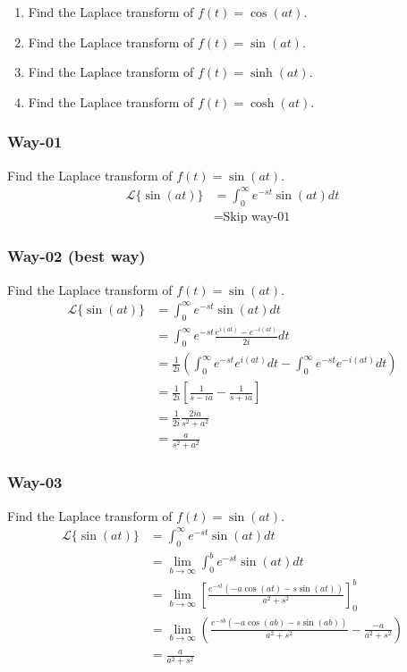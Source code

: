 \documentclass[11pt]{beamer}
\theoremstyle{plain}
\begin{document}
\begin{frame}
        \begin{example}
        \begin{enumerate}[label=\alph*.] 
            \item Find the Laplace transform of $f(t)=\cos(at)$.
            \item Find the Laplace transform of $f(t)=\sin(at)$.
            \item Find the Laplace transform of $f(t)=\sinh(at)$.
            \item Find the Laplace transform of $f(t)=\cosh(at)$.
        \end{enumerate}
    \end{example}
\end{frame}


\begin{frame}
    \frametitle{Way-01}
    Find the Laplace transform of $f(t)=\sin(at)$.
    \begin{align*}
        \mathcal L\{\sin(at)\} &=\int_0^\infty e^{-st}\sin(at)dt\\
        &= \text{Skip way-01} 
    \end{align*}
\end{frame}

\begin{frame}
    \frametitle{Way-02 (best way)}
    Find the Laplace transform of $f(t)=\sin(at)$.
    \begin{align*}
        \mathcal L\{\sin(at)\} &=\int_0^\infty e^{-st}\sin(at)dt \\
        &= \int_0^\infty e^{-st} \frac{e^{i(at)}-e^{-i(at)}}{2i} dt\\
        &= \frac{1}{2i}\left(\int_0^\infty e^{-st} e^{i(at)} dt - \int_0^\infty e^{-st} e^{-i(at)} dt\right) \\
        &= \frac{1}{2i} \left[ \frac{1}{s-ia} - \frac{1}{s+ia} \right]\\
        &=  \frac{1}{2i} \frac{2i a}{s^2 + a^2}\\
        &= \frac{a}{s^2 + a^2}
    \end{align*}
\end{frame}


\begin{frame}
    \frametitle{Way-03}
    Find the Laplace transform of $f(t)=\sin(at)$.
    \begin{align*}
        \mathcal L\{\sin(at)\} &=\int_0^\infty e^{-st}\sin(at)dt \\
        &=\lim_{b\to\infty}\int_0^b e^{-st}\sin(at)dt \\
        &=\lim_{b\to\infty}\left[\frac{e^{-st}(-a\cos(at)-s\sin(at))}{a^2+s^2}\right]_0^b \\
        &=\lim_{b\to\infty}\left(\frac{e^{-sb}(-a\cos(ab)-s\sin(ab))}{a^2+s^2}-\frac{-a}{a^2+s^2}\right) \\
        &=\frac{a}{a^2+s^2}
    \end{align*}
\end{frame}
\end{document}
